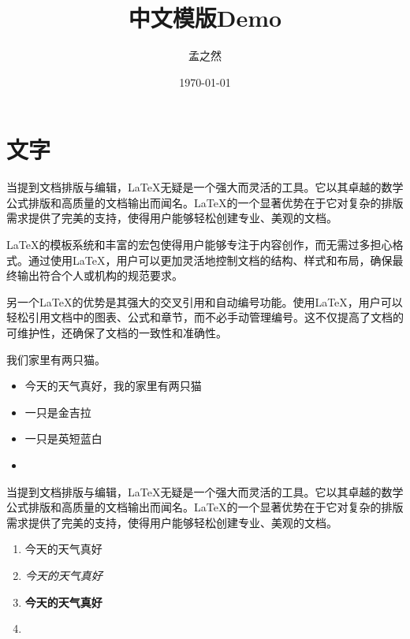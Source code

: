 \documentclass[AutoFakeBold,a4paper]{ctexart}
\title{\textbf{中文模版Demo}}
\author{孟之然}
\date{\today}
\begin{document}
\tableofcontents

\thispagestyle{empty}

\newpage

\setcounter{page}{1}

\maketitle

\thispagestyle{fancy}


\section{文字}

当提到文档排版与编辑\cite{bhagat2017,bittencourt2022,brennan2017,doblhofer2015}，LaTeX无疑是一个强大而灵活的工具。它以其卓越的数学公式排版和高质量的文档输出而闻名。LaTeX的一个显著优势在于它对复杂的排版需求提供了完美的支持，使得用户能够轻松创建专业、美观的文档。

LaTeX的模板系统和丰富的宏包使得用户能够专注于内容创作，而无需过多担心格式。通过使用LaTeX，用户可以更加灵活地控制文档的结构、样式和布局，确保最终输出符合个人或机构的规范要求。

另一个LaTeX的优势是其强大的交叉引用和自动编号功能。使用LaTeX，用户可以轻松引用文档中的图表、公式和章节，而不必手动管理编号。这不仅提高了文档的可维护性，还确保了文档的一致性和准确性。


我们家里有两只猫。


\begin{itemize}
    \item 今天的天气真好，我的家里有两只猫
    \item 一只是金吉拉
    \item 一只是英短蓝白
    \item {}
\end{itemize}


当提到文档排版与编辑，LaTeX无疑是一个强大而灵活的工具。它以其卓越的数学公式排版和高质量的文档输出而闻名。LaTeX的一个显著优势在于它对复杂的排版需求提供了完美的支持，使得用户能够轻松创建专业、美观的文档。


\begin{enumerate}
    \item 今天的天气真好
    \item \emph{今天的天气真好}
    \item \textbf{今天的天气真好}
    \item {}
\end{enumerate}
\end{document}
